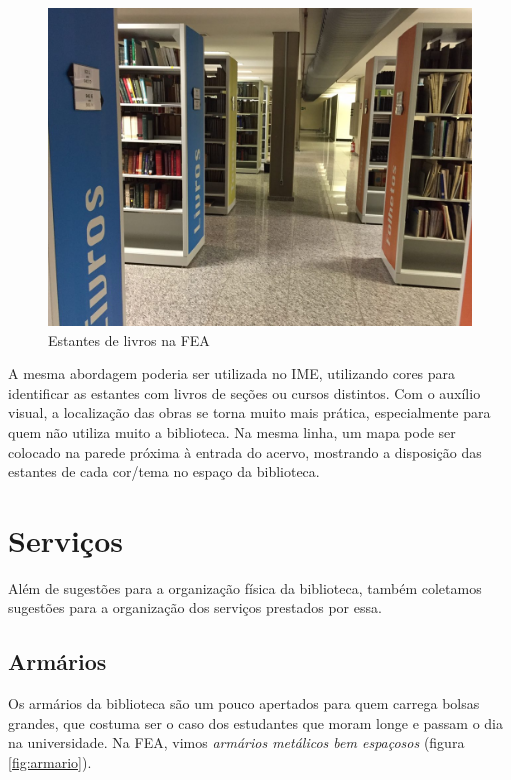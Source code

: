 \documentclass[titlepage]{article}
\begin{document}
\begin{figure}[ht!]
\caption{Estantes de livros na FEA}
\label{fig:cores}
\centering
\includegraphics[width=1\textwidth]{cores}
\end{figure}

A mesma abordagem poderia ser utilizada no IME, utilizando cores para 
identificar as estantes com livros de seções ou cursos distintos. Com o auxílio
visual, a localização das obras se torna muito mais prática, especialmente para 
quem não utiliza muito a biblioteca. Na mesma linha, um mapa pode ser colocado 
na parede próxima à entrada do acervo, mostrando a disposição das estantes de 
cada cor/tema no espaço da biblioteca.  

\clearpage
\section{Serviços}
Além de sugestões para a organização física da biblioteca, também coletamos 
sugestões para a organização dos serviços prestados por essa.

\subsection{Armários}
Os armários da biblioteca são um pouco apertados para quem carrega bolsas 
grandes, que costuma ser o caso dos estudantes que moram longe e passam o dia
na universidade. Na FEA, vimos \emph{armários metálicos bem espaçosos} (figura 
\ref{fig:armario}). 
\end{document}
